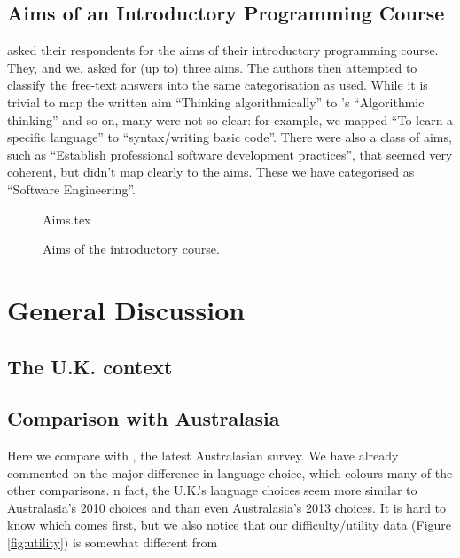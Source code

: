 \documentclass{sig-alternate}
\begin{document}

\subsection{Aims of an Introductory Programming Course}

 \cite{mason+cooper:2014} asked their respondents for the aims of
their introductory programming course. They, and we, asked for (up to)
three aims. The authors then attempted to classify the free-text
answers into the same categorisation as \cite{mason+cooper:2014}
used. While it is trivial to map the written aim ``Thinking
algorithmically'' to \cite{mason+cooper:2014}'s ``Algorithmic
thinking'' and so on, many were not so clear: for example, we mapped
``To learn a specific language'' to ``syntax/writing basic
code''. There were also a class of aims, such as ``Establish
professional software development practices'', that seemed very
coherent, but didn't map clearly to the \cite{mason+cooper:2014}
aims. These we have categorised as ``Software Engineering''.

\begin{figure}
\begin{center}
{Aims.tex}
\end{center}\vskip-18pt
\caption{Aims of the introductory course. \label{fig:aims}}
\end{figure}

\section{General Discussion}\label{discussion}

\subsection{The U.K. context}

\subsection{Comparison with Australasia}

Here we compare with \cite{mason+cooper:2014}, the latest Australasian
survey. We have already commented on the major difference in language
choice, which colours many of the other comparisons. n fact, the
U.K.'s language choices seem more similar to Australasia's 2010
choices \cite{mason-et-al:2012} and \cite[Table 4]{mason+cooper:2014}
than even Australasia's 2013 choices. It is hard to know which comes
first, but we also notice that our difficulty/utility data (Figure
\ref{fig:utility}) is somewhat different from \cite[Figures
7,8]{mason+cooper:2014}
\end{document}

